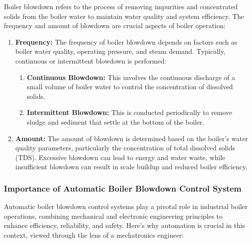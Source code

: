 Boiler blowdown refers to the process of removing impurities and concentrated solids from the boiler water to maintain water quality and system efficiency. The frequency and amount of blowdown are crucial aspects of boiler operation:

\begin{enumerate}
    \item \textbf{Frequency:} The frequency of boiler blowdown depends on factors such as boiler water quality, operating pressure, and steam demand. Typically, continuous or intermittent blowdown is performed:
    \begin{enumerate}
        \item \textbf{Continuous Blowdown:} This involves the continuous discharge of a small volume of boiler water to control the concentration of dissolved solids.
        \item \textbf{Intermittent Blowdown:} This is conducted periodically to remove sludge and sediment that settle at the bottom of the boiler.
    \end{enumerate}
    \item \textbf{Amount:} The amount of blowdown is determined based on the boiler's water quality parameters, particularly the concentration of total dissolved solids (TDS). Excessive blowdown can lead to energy and water waste, while insufficient blowdown can result in scale buildup and reduced boiler efficiency.
\end{enumerate}

\subsubsection{Importance of Automatic Boiler Blowdown Control System}

Automatic boiler blowdown control systems play a pivotal role in industrial boiler operations, combining mechanical and electronic engineering principles to enhance efficiency, reliability, and safety. Here’s why automation is crucial in this context, viewed through the lens of a mechatronics engineer:


